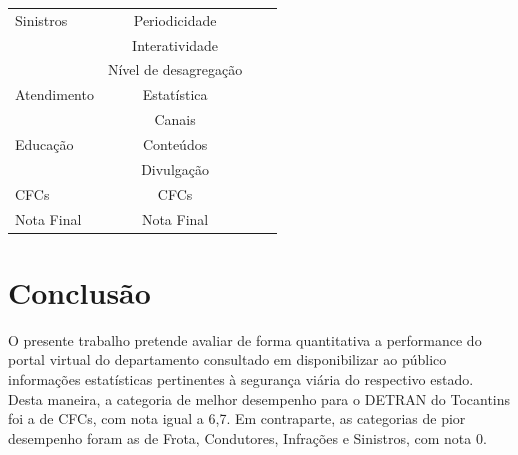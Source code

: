 \documentclass[
  a4paper,
]{article}
\begin{document}
\begin{longtable}{l|ccc}
\midrule\addlinespace[2.5pt]
Sinistros & Periodicidade & \cellcolor[HTML]{D7191C}{\textcolor[HTML]{FFFFFF}{$0,0$}} & \cellcolor[HTML]{D7191C}{\textcolor[HTML]{FFFFFF}{$0,0$}} \\ 
 & Interatividade & \cellcolor[HTML]{D7191C}{\textcolor[HTML]{FFFFFF}{$0,0$}} & \cellcolor[HTML]{D7191C}{\textcolor[HTML]{FFFFFF}{$0,0$}} \\ 
 & Nível de desagregação & \cellcolor[HTML]{D7191C}{\textcolor[HTML]{FFFFFF}{$0,0$}} & \cellcolor[HTML]{D7191C}{\textcolor[HTML]{FFFFFF}{$0,0$}} \\ 
\midrule\addlinespace[2.5pt]
Atendimento & Estatística & \cellcolor[HTML]{D7191C}{\textcolor[HTML]{FFFFFF}{$0,0$}} & \cellcolor[HTML]{D7191C}{\textcolor[HTML]{FFFFFF}{$0,0$}} \\ 
 & Canais & \cellcolor[HTML]{1FA149}{\textcolor[HTML]{FFFFFF}{$10,0$}} & \cellcolor[HTML]{1FA149}{\textcolor[HTML]{FFFFFF}{$10,0$}} \\ 
\midrule\addlinespace[2.5pt]
Educação & Conteúdos & \cellcolor[HTML]{D7191C}{\textcolor[HTML]{FFFFFF}{$0,0$}} & \cellcolor[HTML]{F05E22}{\textcolor[HTML]{FFFFFF}{$3,3$}} \\ 
 & Divulgação & \cellcolor[HTML]{D7191C}{\textcolor[HTML]{FFFFFF}{$0,0$}} & \cellcolor[HTML]{F5951E}{\textcolor[HTML]{000000}{$6,7$}} \\ 
\midrule\addlinespace[2.5pt]
CFCs & CFCs & \cellcolor[HTML]{1FA149}{\textcolor[HTML]{FFFFFF}{$10,0$}} & \cellcolor[HTML]{F5951E}{\textcolor[HTML]{000000}{$6,7$}} \\ 
\midrule\addlinespace[2.5pt]
Nota Final & Nota Final & \cellcolor[HTML]{ED5921}{\textcolor[HTML]{FFFFFF}{$2,9$}} & \cellcolor[HTML]{E94F20}{\textcolor[HTML]{FFFFFF}{$2,4$}} \\ 
\bottomrule

\end{longtable}

\section{Conclusão}\label{conclusuxe3o}

O presente trabalho pretende avaliar de forma quantitativa a performance
do portal virtual do departamento consultado em disponibilizar ao
público informações estatísticas pertinentes à segurança viária do
respectivo estado. Desta maneira, a categoria de melhor desempenho para
o DETRAN do Tocantins foi a de CFCs, com nota igual a 6,7. Em
contraparte, as categorias de pior desempenho foram as de Frota,
Condutores, Infrações e Sinistros, com nota 0.
\end{document}
